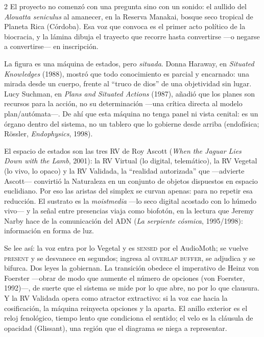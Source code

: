 \documentclass[11pt]{article}
\begin{document}
\begin{multicols}{2}\small\setlength{\parindent}{1em}\setlength{\parskip}{0.45em}
El proyecto no comenzó con una pregunta sino con un sonido: el aullido del \emph{Alouatta seniculus} al amanecer, en la Reserva Manakai, bosque seco tropical de Planeta Rica (Córdoba). Esa voz que convoca es el primer acto político de la biocracia, y la lámina dibuja el trayecto que recorre hasta convertirse —o negarse a convertirse— en inscripción.

La figura es una máquina de estados, pero \emph{situada}. Donna Haraway, en \emph{Situated Knowledges} (1988), mostró que todo conocimiento es parcial y encarnado: una mirada desde un cuerpo, frente al ``truco de dios'' de una objetividad sin lugar. Lucy Suchman, en \emph{Plans and Situated Actions} (1987), añadió que los planes son recursos para la acción, no su determinación —una crítica directa al modelo plan/autómata—. De ahí que esta máquina no tenga panel ni vista cenital: es un órgano dentro del sistema, no un tablero que lo gobierne desde arriba (endofísica; Rössler, \emph{Endophysics}, 1998).

El espacio de estados son las tres RV de Roy Ascott (\emph{When the Jaguar Lies Down with the Lamb}, 2001): la RV Virtual (lo digital, telemático), la RV Vegetal (lo vivo, lo opaco) y la RV Validada, la ``realidad autorizada'' que —advierte Ascott— convirtió la Naturaleza en un conjunto de objetos dispuestos en espacio euclidiano. Por eso las aristas del simplex se curvan apenas: para no repetir esa reducción. El sustrato es la \emph{moistmedia} —lo seco digital acostado con lo húmedo vivo— y la señal entre presencias viaja como biofotón, en la lectura que Jeremy Narby hace de la comunicación del ADN (\emph{La serpiente cósmica}, 1995/1998): información en forma de luz.

Se lee así: la voz entra por lo Vegetal y es \textsc{sensed} por el AudioMoth; se vuelve \textsc{present} y se desvanece en segundos; ingresa al \textsc{overlap buffer}, se adjudica y se bifurca. Dos leyes la gobiernan. La transición obedece el imperativo de Heinz von Foerster —obrar de modo que aumente el número de opciones (von Foerster, 1992)—, de suerte que el sistema se mide por lo que abre, no por lo que clausura. Y la RV Validada opera como atractor extractivo: si la voz cae hacia la cosificación, la máquina reinyecta opciones y la aparta. El anillo exterior es el reloj fenológico, tiempo lento que condiciona el sentido; el velo es la cláusula de opacidad (Glissant), una región que el diagrama se niega a representar.
\end{multicols}
\end{document}
